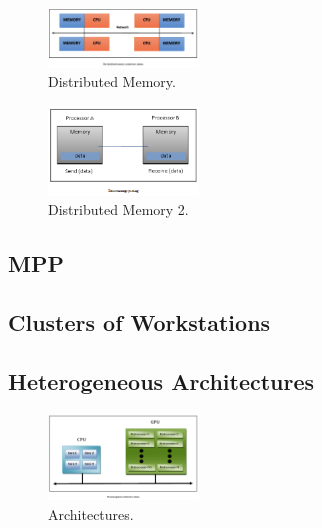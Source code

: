 \begin{figure}[H]
	\includegraphics[width=4cm]{figures/kelompok2/chapter1/8.png}
	\centering
	\caption{Distributed Memory.}
\end{figure}

\begin{figure}[H]
	\includegraphics[width=4cm]{figures/kelompok2/chapter1/9.png}
	\centering
	\caption{Distributed Memory 2.}
\end{figure}

\subsection{MPP}

\subsection{Clusters of Workstations}

\subsection{Heterogeneous Architectures}

\begin{figure}[H]
	\includegraphics[width=4cm]{figures/kelompok2/chapter1/10.png}
	\centering
	\caption{Architectures.}
\end{figure}
